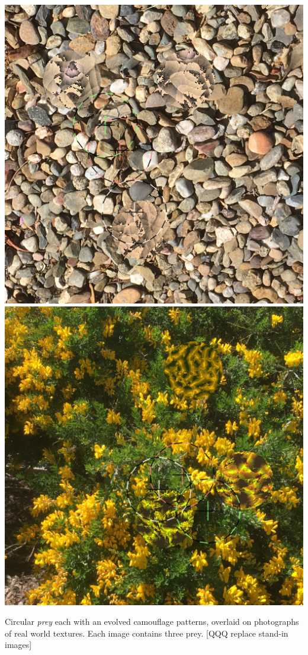\documentclass[sigconf]{acmart}
\begin{document}
\begin{teaserfigure}
    \hfill
    \includegraphics[scale=0.24]{images/20221003_step_3667.png}
    \hfill
    \includegraphics[scale=0.24]{images/20220930_step_6093.png}
    \caption{Circular \textit{prey} each with an evolved camouflage patterns, overlaid on photographs of real world textures. Each image contains three prey. [QQQ replace stand-in images]}
    \label{fig:teaser}
    \vspace{5mm} %
\end{teaserfigure}
\end{document}
